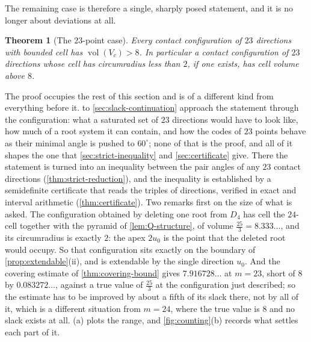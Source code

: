 \documentclass[11pt,reqno]{amsart}
\renewcommand{\_}{\origunderscore\allowbreak}
\numberwithin{equation}{section}
\theoremstyle{plain}
\newtheorem{thm}{Theorem}[section]
\theoremstyle{definition}
\theoremstyle{remark}
\newcommand{\base}{u}                        %
\DeclareMathOperator{\vol}{vol}
\begin{document}
The remaining case is therefore a single, sharply posed statement, and
it is no longer about deviations at all.

\begin{thm}[The $23$-point case]\label{thm:m23}
Every contact configuration of $23$ directions with bounded cell has
$\vol(V_c)>8$. In particular a contact configuration of $23$ directions
whose cell has circumradius less than $2$, if one exists, has cell
volume above $8$.
\end{thm}

The proof occupies the rest of this section and is of a different kind
from everything before it.  to
\cref{sec:slack-continuation} approach the statement through the
configuration: what a saturated set of $23$ directions would have to
look like, how much of a root system it can contain, and how the codes
of $23$ points behave as their minimal angle is pushed to $60^\circ$;
none of that is the proof, and all of it shapes the one that
\cref{sec:strict-inequality} and \cref{sec:certificate} give. There the
statement is turned into an inequality between the pair angles of any
$23$ contact directions (\cref{thm:strict-reduction}), and the
inequality is established by a semidefinite certificate that reads the
triples of directions, verified in exact and interval arithmetic
(\cref{thm:certificate}). Two remarks first on the size of what is
asked. The configuration obtained by deleting
one root from $D_4$ has cell the $24$-cell together with the pyramid of
\cref{lem:Q-structure}, of volume $\tfrac{25}3=8.333\ldots$, and its
circumradius is exactly $2$: the apex $2\base_0$ is the point that the
deleted root would occupy. So that configuration sits exactly on the
boundary of \cref{prop:extendable}(ii), and is extendable by the single
direction $\base_0$. And the covering estimate of
\cref{thm:covering-bound} gives $7.916728\ldots$ at $m=23$, short of $8$
by $0.083272\ldots$, against a true value of $\tfrac{25}3$ at the
configuration just described; so the estimate has to be improved by
about a fifth of its slack there, not by all of it, which is a different
situation from $m=24$, where the true value is $8$ and no slack exists
at all.
(a) plots the range, and \cref{fig:counting}(b)
records what settles each part of it.
\end{document}
